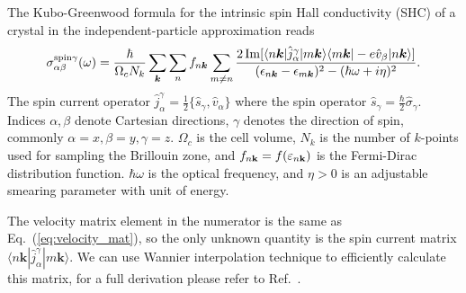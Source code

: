 The Kubo-Greenwood formula for the intrinsic spin Hall conductivity (SHC) of a crystal
in the independent-particle approximation reads \cite{qiao-prb2018,guo-prl2008}
%
\begin{equation}
\label{eq:kubo_shc}
\sigma_{\alpha\beta}^{\text{spin}\gamma}(\omega) =  \frac{\hbar}{\Omega_c N_k}
\sum_{\bm{k}}\sum_{n} f_{n\bm{k}} \\
\sum_{m \neq n}
\frac{2\operatorname{Im}[\langle n\bm{k}| \hat{j}_{\alpha}^{\gamma}|m\bm{k}\rangle
	\langle m\bm{k}| -e\hat{v}_{\beta}|n\bm{k}\rangle]}
{(\epsilon_{n\bm{k}}-\epsilon_{m\bm{k}})^2-(\hbar\omega +i\eta)^2}.
\end{equation}
%
The spin current operator 
$\hat{j}_{\alpha}^{\gamma}=
\frac{1}{2}\{\hat{s}_{\gamma},\hat{v}_{\alpha}\}$ where the spin operator $\hat{s}_{\gamma}=\frac{\hbar}{2}\hat{\sigma}_{\gamma}$. Indices $\alpha,\beta$ denote Cartesian directions, $\gamma$ denotes the direction of spin, commonly $\alpha = x, \beta = y, \gamma = z$.  $\Omega_c$ is the
cell volume, $N_k$ is the number of $k$-points used for sampling the
Brillouin zone, and $f_{n{\bf k}}=f(\varepsilon_{n{\bf k}})$ is the
Fermi-Dirac distribution function. $\hbar\omega$ is the optical
frequency, and $\eta>0$ is an adjustable smearing parameter with unit
of energy.

The velocity matrix element in the numerator is the same as   Eq.~(\ref{eq:velocity_mat}), 
so the only unknown quantity is the spin current matrix $\langle n\bm{k}| \hat{j}_{\alpha}^{\gamma}|m\bm{k}\rangle$. 
We can use Wannier interpolation technique to efficiently calculate this matrix, for a full derivation please refer to Ref.~\cite{qiao-prb2018}. 

